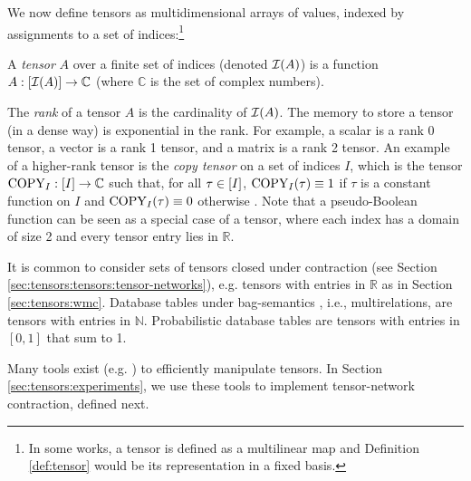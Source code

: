
We now define tensors as multidimensional arrays of values, indexed by assignments to a set of indices:\footnote{In some works, a tensor is defined as a multilinear map and Definition \ref{def:tensor} would be its representation in a fixed basis.}
\begin{definition}[Tensor] \label{def:tensor}
	A \emph{tensor} $A$ over a finite set of indices (denoted $\mathcal{I}(A)$) is a function $A: [\mathcal{I}(A)] \rightarrow \mathbb{C}$ (where $\mathbb{C}$ is the set of complex numbers).
\end{definition}

The \emph{rank} of a tensor $A$ is the cardinality of $\mathcal{I}(A)$. The memory to store a tensor (in a dense way) is exponential in the rank. For example, a scalar is a rank 0 tensor, a vector is a rank 1 tensor, and a matrix is a rank 2 tensor. An example of a higher-rank tensor is the \emph{copy tensor} on a set of indices $I$, which is the tensor $\text{COPY}_I: [I] \rightarrow \mathbb{C}$ such that, for all $\tau \in [I]$, $\text{COPY}_I(\tau) \equiv 1$ if $\tau$ is a constant function on $I$ and $\text{COPY}_I(\tau) \equiv 0$ otherwise \cite{BCJ11}.
Note that a pseudo-Boolean function can be seen as a special case of a tensor, where each index has a domain of size 2 and every tensor entry lies in $\mathbb{R}$.

It is common to consider sets of tensors closed under contraction (see Section \ref{sec:tensors:tensors:tensor-networks}), e.g. tensors with entries in $\mathbb{R}$ as in Section \ref{sec:tensors:wmc}. Database tables under bag-semantics \cite{CV93}, i.e., multirelations, are tensors with entries in $\mathbb{N}$. Probabilistic database tables \cite{CP87} are tensors with entries in $[0, 1]$ that sum to 1.

Many tools exist (e.g.  \cite{numpy}) to efficiently manipulate tensors. In Section \ref{sec:tensors:experiments}, we use these tools to implement tensor-network contraction, defined next.


